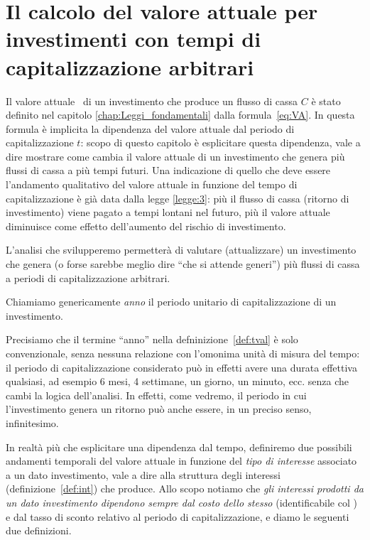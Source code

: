 \chapter[Il calcolo del valore attuale]{Il calcolo del valore attuale per investimenti con tempi di capitalizzazione  arbitrari}
\label{chap:Formule_fondamentali}

Il valore attuale \VA\ di un investimento che produce un flusso di cassa $C$ è stato definito nel capitolo
\ref{chap:Leggi_fondamentali} dalla formula~\eqref{eq:VA}. In questa formula è implicita la dipendenza del
valore attuale dal periodo di capitalizzazione $t$: scopo di questo capitolo è esplicitare questa dipendenza,
vale a dire mostrare come cambia il valore attuale di un investimento che genera più flussi di cassa a più
tempi futuri.
Una indicazione di quello che deve essere l'andamento qualitativo del valore attuale in funzione del tempo
di capitalizzazione è già data dalla legge \ref{legge:3}: più il flusso di cassa (ritorno di investimento)
viene pagato a tempi lontani nel futuro, più il valore attuale diminuisce come effetto dell'aumento del
rischio di investimento.
 
L'analisi che svilupperemo permetterà di valutare (attualizzare) un investimento che genera (o forse
sarebbe meglio dire ``che si attende generi'') più flussi di cassa a periodi di capitalizzazione arbitrari.

\begin{defn}\label{def:tval}
  Chiamiamo genericamente \emph{anno} il periodo unitario di capitalizzazione di un investimento.
\end{defn}

Precisiamo che il termine ``anno'' nella defninizione~\ref{def:tval} è solo convenzionale, senza nessuna
relazione con l'omonima unità di misura del tempo: il periodo di capitalizzazione considerato può in effetti
avere una durata effettiva qualsiasi, ad esempio 6 mesi, 4 settimane, un giorno, un minuto, ecc. senza che
cambi la logica dell'analisi. In effetti, come vedremo, il periodo in cui l'investimento genera un ritorno
può anche essere, in un preciso senso, infinitesimo.

In realtà più che esplicitare una dipendenza dal tempo, definiremo due possibili andamenti temporali
del valore attuale in funzione del \emph{tipo di interesse} associato a un dato investimento, vale a dire
alla struttura degli interessi (definizione~\ref{def:int}) che produce. Allo scopo notiamo che \emph{gli 
interessi prodotti da un dato investimento dipendono sempre dal costo dello stesso} (identificabile
col \VA) e dal tasso di sconto relativo al periodo di capitalizzazione, e diamo le seguenti due definizioni.

